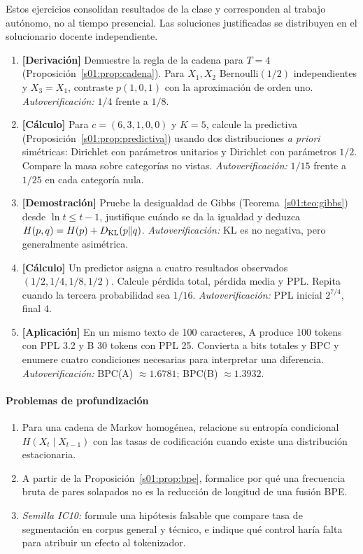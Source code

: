 \noindent Estos ejercicios consolidan resultados de la clase y corresponden al
trabajo autónomo, no al tiempo presencial. Las soluciones justificadas se distribuyen en el solucionario docente independiente.
\begin{enumerate}
\item \textbf{[Derivación]} Demuestre la regla de la cadena para $T=4$ (Proposición~\ref{s01:prop:cadena}).
Para $X_1,X_2$ Bernoulli$(1/2)$ independientes y $X_3=X_1$,
contraste $p(1,0,1)$ con la aproximación de orden uno.
\emph{Autoverificación:} $1/4$ frente a $1/8$.
\item \textbf{[Cálculo]} Para $c=(6,3,1,0,0)$ y $K=5$,
calcule la predictiva (Proposición~\ref{s01:prop:predictiva}) usando dos distribuciones \emph{a priori} simétricas:
Dirichlet con parámetros unitarios y Dirichlet con parámetros $1/2$.
Compare la masa sobre categorías no vistas.
\emph{Autoverificación:} $1/15$ frente a $1/25$ en cada categoría nula.
\item \textbf{[Demostración]} Pruebe la desigualdad de Gibbs (Teorema~\ref{s01:teo:gibbs}) desde $\ln t\le t-1$,
justifique cuándo se da la igualdad y deduzca
$H(p,q)=H(p)+D_{\rm KL}(p\|q)$.
\emph{Autoverificación:} KL es no negativa, pero generalmente asimétrica.
\item \textbf{[Cálculo]} Un predictor asigna a cuatro resultados observados
$(1/2,1/4,1/8,1/2)$. Calcule pérdida total, pérdida media y
PPL. Repita cuando la tercera probabilidad sea $1/16$.
\emph{Autoverificación:} PPL inicial $2^{7/4}$, final $4$.
\item \textbf{[Aplicación]} En un mismo texto de 100 caracteres, A
produce 100 tokens con PPL 3.2 y B 30 tokens con PPL 25.
Convierta a bits totales y BPC y enumere cuatro condiciones necesarias
para interpretar una diferencia.
\emph{Autoverificación:} BPC(A) $\approx1.6781$;
BPC(B) $\approx1.3932$.
\end{enumerate}
\paragraph{Problemas de profundización}
\begin{enumerate}
\item[(S1.A)] Para una cadena de Markov homogénea, relacione su
entropía condicional $H(X_t\mid X_{t-1})$ con las tasas de
codificación cuando existe una distribución estacionaria.
\item[(S1.B)] A partir de la Proposición~\ref{s01:prop:bpe}, formalice por qué una frecuencia bruta de pares solapados
no es la reducción de longitud de una fusión BPE.
\item[(S1.C)] \emph{Semilla IC10:} formule una hipótesis falsable que
compare tasa de segmentación en corpus general y técnico, e indique
qué control haría falta para atribuir un efecto al tokenizador.
\end{enumerate}






